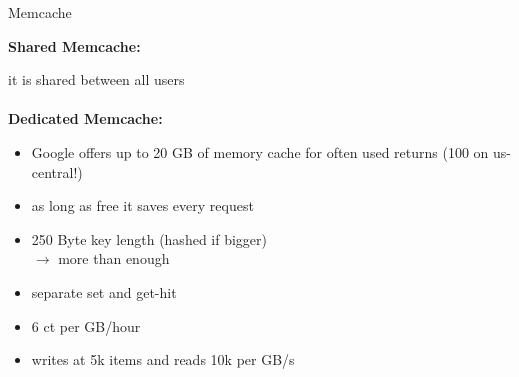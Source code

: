 \documentclass{beamer}
\begin{document}
\begin{frame}{Memcache}
	
	\begin{center}
\textbf{	Shared Memcache:} \\
	\item it is shared between all users\\ \ \\
	
\textbf 	{Dedicated Memcache:}\\ 
	\begin{itemize}
		\centering
		\item Google offers up to 20 GB of memory cache for often used returns (100 on us-central!)
		\item as long as free it saves every request 
		\item 250 Byte key length (hashed if bigger) \\
		$\rightarrow$ more than enough 
		\item separate  set and get-hit
		\item 6 ct per GB/hour 
		\item writes at 5k items and reads 10k per  GB/s
	\end{itemize}

	\end{center}
\end{frame}
\end{document}
